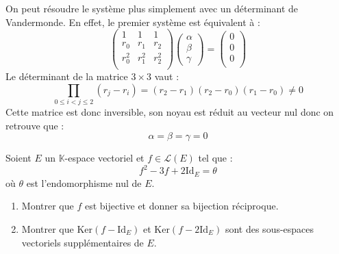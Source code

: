\documentclass[a4paper,10pt]{report}
\begin{document}
\begin{enumerate}
\medskip

\noindent On peut résoudre le système plus simplement avec un déterminant de Vandermonde. En effet, le premier système est équivalent à :
$$ \begin{pmatrix}
1 & 1 & 1 \\
r_0 & r_1 & r_2 \\
r_0^2 & r_1^2 & r_2^2 \\
\end{pmatrix} \begin{pmatrix}
\alpha \\
\beta \\
\gamma
\end{pmatrix} = \begin{pmatrix}
0 \\
0 \\
0 \\
\end{pmatrix}$$ 
Le déterminant de la matrice $3 \times 3$ vaut :
$$ \prod_{0 \leq i <j \leq 2} (r_j-r_i) = (r_2-r_1)(r_2-r_0)(r_1-r_0) \neq 0$$
Cette matrice est donc inversible, son noyau est réduit au vecteur nul donc on retrouve que :
$$ \alpha = \beta = \gamma = 0$$
\end{enumerate}


\medskip


\begin{Exa} Soient $E$ un $\mathbb{K}$-espace vectoriel et $f \in \mathcal{L}(E)$ tel que :
    \[
    f^2 - 3f + 2 \textrm{Id}_E = \theta
    \]
où $\theta$ est l'endomorphisme nul de $E$.
    \begin{enumerate}
      \item Montrer que $f$ est bijective et donner sa bijection réciproque.
      \item Montrer que $\textrm{Ker}(f - \textrm{Id}_E)$ et $\textrm{Ker}(f - 2\textrm{Id}_E)$ sont des sous-espaces vectoriels supplémentaires de $E$.
    \end{enumerate}
\end{Exa}

\corr 
\end{document}
